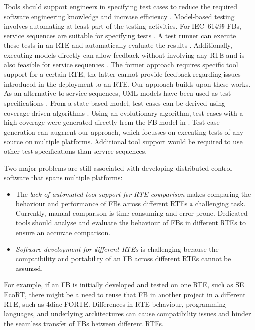 Tools should support engineers in specifying test cases to reduce the required software engineering knowledge and increase efficiency \cite{hametner2014}. Model-based testing involves automating at least part of the testing activities. For IEC~61499 FBs, service sequences are suitable for specifying tests \cite{hametner2014}. 
A test runner can execute these tests in an RTE and automatically evaluate the results \cite{hametner2014}. Additionally, executing models directly can allow feedback without involving any RTE and is also feasible for service sequences \cite{wiesmayr2021}. The former approach requires specific tool support for a certain RTE, the latter cannot provide feedback regarding issues introduced in the deployment to an RTE. Our approach builds upon these works. 
As an alternative to service sequences, UML models have been used as test specifications \cite{Hussain.2006}. From a state-based model, test cases can be derived using coverage-driven algorithms \cite{Hussain.2006}. Using an evolutionary algorithm, test cases with a high coverage were generated directly from the FB model in \cite{Buzhinsky.2015}. Test case generation can augment our approach, which focusses on executing tests of any source on multiple platforms. Additional tool support would be required to use other test specifications than service sequences.

Two major problems are still associated with developing distributed control software that spans multiple platforms: 
\begin{itemize}
    \item The \emph{lack of automated tool support for RTE comparison} makes comparing the behaviour and performance of FBs across different RTEs a challenging task. Currently, manual comparison is time-consuming and error-prone. Dedicated tools should analyse and evaluate the behaviour of FBs in different RTEs to ensure an accurate comparison.
    \item \emph{Software development for different RTEs} is challenging because the compatibility and portability of an FB across different RTEs cannot be assumed.
\end{itemize}
For example, if an FB is initially developed and tested on one RTE, such as SE EcoRT, there might be a need to reuse that FB in another project in a different RTE, such as 4diac FORTE. Differences in RTE behaviour, programming languages, and underlying architectures can cause compatibility issues and hinder the seamless transfer of FBs between different RTEs. 

